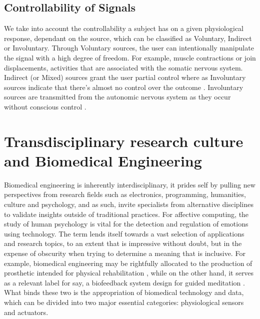 \subsection{Controllability of Signals}

We take into account the controllability a subject has on a given physiological response, dependant on the source, which can be classified as Voluntary, Indirect or Involuntary. Through Voluntary sources, the user can intentionally manipulate the signal with a high degree of freedom. For example, muscle contractions or join displacements, activities that are associated with the somatic nervous system. Indirect (or Mixed) sources grant the user partial control where as Involuntary sources indicate that there's almost no control over the outcome \cite{da_silva_biosignal_2017}. Involuntary sources are transmitted from the autonomic nervous system as they occur without conscious control \cite{lenman_human_1975}.




\section{Transdisciplinary research culture and Biomedical Engineering}

Biomedical engineering is inherently interdisciplinary, it prides self by pulling new perspectives from research fields such as electronics, programming, humanities, culture and psychology, and as such, invite specialists from alternative disciplines to validate insights outside of traditional practices. For affective computing, the study of human psychology is vital for the detection and regulation of emotions using technology. The term lends itself towards a vast selection of applications and research topics, to an extent that is impressive without doubt, but in the expense of obscurity when trying to determine a meaning that is inclusive. For example, biomedical engineering may be rightfully allocated to the production of prosthetic intended for physical rehabilitation \cite{}, while on the other hand, it serves as a relevant label for say, a biofeedback system design for guided meditation \cite{foo_soft_2020}. What binds these two is the appropriation of biomedical technology and data, which can be divided into two major essential categories: physiological sensors and actuators.

